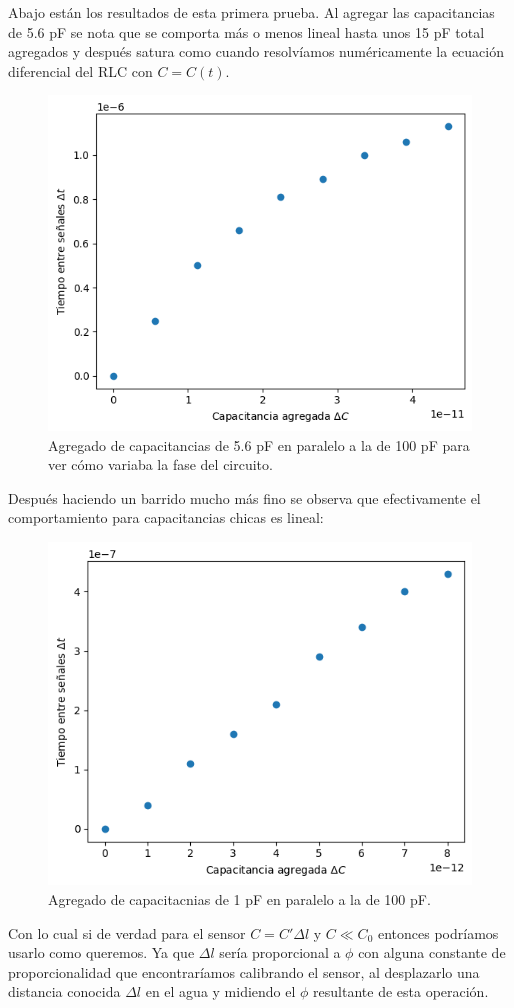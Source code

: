Abajo están los resultados de esta primera prueba. Al agregar las capacitancias de 5.6 pF se nota que se comporta más o menos lineal hasta unos 15 pF total agregados y después satura como cuando resolvíamos numéricamente la ecuación diferencial del RLC con $C=C(t)$.


\begin{figure}[!ht]
	\centering
	\includegraphics[width=0.567\linewidth]{Figures/28_04_2025/Barrido_grande}
	\caption{Agregado de capacitancias de 5.6 pF en paralelo a la de 100 pF para ver cómo variaba la fase del circuito.}
	\label{fig:barridogrande}
\end{figure}

Después haciendo un barrido mucho más fino se observa que efectivamente el comportamiento para capacitancias chicas es lineal: %

\begin{figure}[!ht]
	\centering
	\includegraphics[width=0.567\linewidth]{Figures/28_04_2025/Barrido_chico}
	\caption{Agregado de capacitacnias de 1 pF en paralelo a la de 100 pF.}
	\label{fig:barridochico}
\end{figure}

Con lo cual si de verdad para el sensor $C=C'\Delta l $ y $C\ll C_0$ entonces podríamos usarlo como queremos. Ya que $\Delta l$ sería proporcional a $\phi$ con alguna constante de proporcionalidad que encontraríamos calibrando el sensor, al desplazarlo una distancia conocida $\Delta l$ en el agua y midiendo el $\phi$ resultante de esta operación. 

